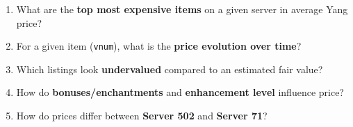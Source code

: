 \begin{questionbox}
\begin{enumerate}
  \item What are the \textbf{top most expensive items} on a given server in average Yang price?
  \item For a given item (\texttt{vnum}), what is the \textbf{price evolution over time}?
  \item Which listings look \textbf{undervalued} compared to an estimated fair value?
  \item How do \textbf{bonuses/enchantments} and \textbf{enhancement level} influence price?
  \item How do prices differ between \textbf{Server 502} and \textbf{Server 71}?
\end{enumerate}
\end{questionbox}

